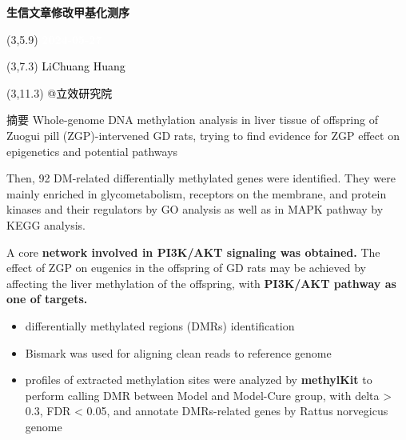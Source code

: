 \documentclass[
  ignorenonframetext,
]{beamer}
\author{}
\date{\vspace{-2.5em}}
\providecommand{\tightlist}{%
  \setlength{\itemsep}{0pt}\setlength{\parskip}{0pt}}
\begin{document}
\begin{frame}
\begin{titlepage} 
\begin{center} \textbf{\Huge
生信文章修改甲基化测序} \vspace{4em}
\begin{textblock}{10}(3,5.9) \huge
\textbf{\textcolor{white}{2024-05-27}}
\end{textblock} \begin{textblock}{10}(3,7.3)
\Large \textcolor{black}{LiChuang Huang}
\end{textblock} \begin{textblock}{10}(3,11.3)
\Large \textcolor{black}{@立效研究院}
\end{textblock} \end{center} \end{titlepage}
\restoregeometry


\tableofcontents

\listoffigures

\listoftables



\end{frame}

\begin{frame}{摘要}
\protect\hypertarget{abstract}{}
Whole-genome DNA methylation analysis in liver tissue of offspring of
Zuogui pill (ZGP)-intervened GD rats, trying to find evidence for ZGP
effect on epigenetics and potential pathways

Then, 92 DM-related differentially methylated genes were identified.
They were mainly enriched in glycometabolism, receptors on the membrane,
and protein kinases and their regulators by GO analysis as well as in
MAPK pathway by KEGG analysis.

A core \textbf{network involved in PI3K/AKT signaling was obtained.} The
effect of ZGP on eugenics in the offspring of GD rats may be achieved by
affecting the liver methylation of the offspring, with \textbf{PI3K/AKT
pathway as one of targets.}

\begin{itemize}
\tightlist
\item
  differentially methylated regions (DMRs) identification
\item
  Bismark was used for aligning clean reads to reference genome
\item
  profiles of extracted methylation sites were analyzed by
  \textbf{methylKit} to perform calling DMR between Model and Model-Cure
  group, with \textbar delta\textbar{} \textgreater{} 0.3, FDR
  \textless{} 0.05, and annotate DMRs-related genes by Rattus norvegicus
  genome
\end{itemize}
\end{frame}
\end{document}
